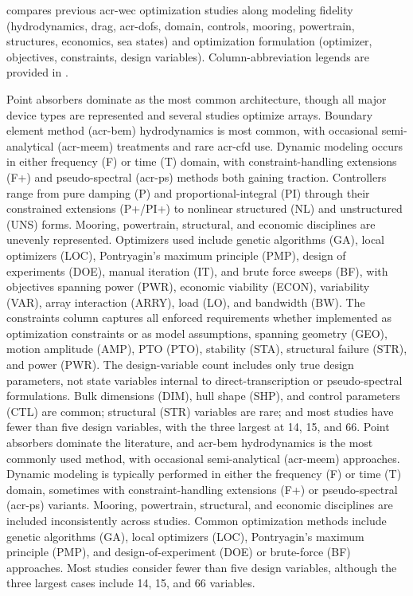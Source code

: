  compares previous \gls{acr-wec} optimization studies along modeling fidelity (hydrodynamics, drag, \glspl{acr-dof}, domain, controls, mooring, powertrain, structures, economics, sea states) and optimization formulation (optimizer, objectives, constraints, design variables).
Column-abbreviation legends are provided in .

\ifdefined\DISSERTATION
    Point absorbers dominate as the most common architecture, though all major device types are represented and several studies optimize arrays.
    Boundary element method (\gls{acr-bem}) hydrodynamics is most common, with occasional semi-analytical (\gls{acr-meem}) treatments and rare \gls{acr-cfd} use.
    Dynamic modeling occurs in either frequency (F) or time (T) domain, with constraint-handling extensions (F+) and pseudo-spectral (\gls{acr-ps}) methods both gaining traction.
    Controllers range from pure damping (P) and proportional-integral (PI) through their constrained extensions (P+/PI+) to nonlinear structured (NL) and unstructured (UNS) forms.
    Mooring, powertrain, structural, and economic disciplines are unevenly represented.
    Optimizers used include genetic algorithms (GA), local optimizers (LOC), Pontryagin's maximum principle (PMP), design of experiments (DOE), manual iteration (IT), and brute force sweeps (BF), with objectives spanning power (PWR), economic viability (ECON), variability (VAR), array interaction (ARRY), load (LO), and bandwidth (BW).
    The constraints column captures all enforced requirements whether implemented as optimization constraints or as model assumptions, spanning geometry (GEO), motion amplitude (AMP), PTO (PTO), stability (STA), structural failure (STR), and power (PWR).
    The design-variable count includes only true design parameters, not state variables internal to direct-transcription or pseudo-spectral formulations.
    Bulk dimensions (DIM), hull shape (SHP), and control parameters (CTL) are common; structural (STR) variables are rare; and most studies have fewer than five design variables, with the three largest at 14, 15, and 66.
\else
    Point absorbers dominate the literature, and \gls{acr-bem} hydrodynamics is the most commonly used method, with occasional semi-analytical (\gls{acr-meem}) approaches.
    Dynamic modeling is typically performed in either the frequency (F) or time (T) domain, sometimes with constraint-handling extensions (F+) or pseudo-spectral (\gls{acr-ps}) variants.
    Mooring, powertrain, structural, and economic disciplines are included inconsistently across studies.
    Common optimization methods include genetic algorithms (GA), local optimizers (LOC), Pontryagin's maximum principle (PMP), and design-of-experiment (DOE) or brute-force (BF) approaches.
    Most studies consider fewer than five design variables, although the three largest cases include 14, 15, and 66 variables.
\fi

